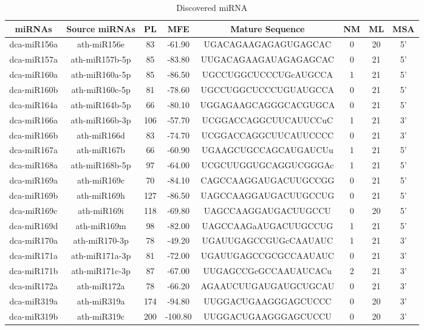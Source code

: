 \documentclass[preview=true,varwidth=\maxdimen]{standalone}
\begin{document}
\begin{table}
\centering
\caption{Discovered miRNA}\begin{tabular}{c c c c c c c c}
\\\toprule
\textbf{miRNAs} & \textbf{Source miRNAs} & \textbf{PL} & \textbf{MFE} & \textbf{Mature Sequence} & \textbf{NM} & \textbf{ML} & \textbf{MSA}\\
\midrule
dca-miR156a & ath-miR156e & 83 & -61.90 & UGACAGAAGAGAGUGAGCAC & 0 & 20 & 5'\\
dca-miR157a & ath-miR157b-5p & 85 & -83.80 & UUGACAGAAGAUAGAGAGCAC & 0 & 21 & 5'\\
dca-miR160a & ath-miR160a-5p & 85 & -86.50 & UGCCUGGCUCCCUGcAUGCCA & 1 & 21 & 5'\\
dca-miR160b & ath-miR160c-5p & 81 & -78.60 & UGCCUGGCUCCCUGUAUGCCA & 0 & 21 & 5'\\
dca-miR164a & ath-miR164b-5p & 66 & -80.10 & UGGAGAAGCAGGGCACGUGCA & 0 & 21 & 5'\\
dca-miR166a & ath-miR166b-3p & 106 & -57.70 & UCGGACCAGGCUUCAUUCCuC & 1 & 21 & 3'\\
dca-miR166b & ath-miR166d & 83 & -74.70 & UCGGACCAGGCUUCAUUCCCC & 0 & 21 & 3'\\
dca-miR167a & ath-miR167b & 66 & -60.90 & UGAAGCUGCCAGCAUGAUCUu & 1 & 21 & 5'\\
dca-miR168a & ath-miR168b-5p & 97 & -64.00 & UCGCUUGGUGCAGGUCGGGAc & 1 & 21 & 5'\\
dca-miR169a & ath-miR169c & 70 & -84.10 & CAGCCAAGGAUGACUUGCCGG & 0 & 21 & 5'\\
dca-miR169b & ath-miR169h & 127 & -86.50 & UAGCCAAGGAUGACUUGCCUG & 0 & 21 & 5'\\
dca-miR169c & ath-miR169i & 118 & -69.80 & UAGCCAAGGAUGACUUGCCU & 0 & 20 & 5'\\
dca-miR169d & ath-miR169m & 98 & -82.00 & UAGCCAAGaAUGACUUGCCUG & 1 & 21 & 5'\\
dca-miR170a & ath-miR170-3p & 78 & -49.20 & UGAUUGAGCCGUGcCAAUAUC & 1 & 21 & 3'\\
dca-miR171a & ath-miR171a-3p & 81 & -72.00 & UGAUUGAGCCGCGCCAAUAUC & 0 & 21 & 3'\\
dca-miR171b & ath-miR171c-3p & 87 & -67.00 & UUGAGCCGcGCCAAUAUCACu & 2 & 21 & 3'\\
dca-miR172a & ath-miR172a & 78 & -66.20 & AGAAUCUUGAUGAUGCUGCAU & 0 & 21 & 3'\\
dca-miR319a & ath-miR319a & 174 & -94.80 & UUGGACUGAAGGGAGCUCCC & 0 & 20 & 3'\\
dca-miR319b & ath-miR319c & 200 & -100.80 & UUGGACUGAAGGGAGCUCCU & 0 & 20 & 3'\\

\end{tabular}
\end{table}
\end{document}
